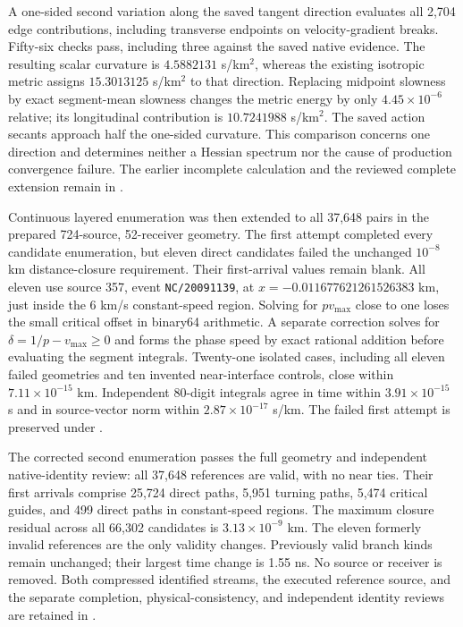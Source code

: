 A one-sided second variation along the saved tangent direction evaluates all
2,704 edge contributions, including transverse endpoints on velocity-gradient
breaks. Fifty-six checks pass, including three against the saved native
evidence. The resulting scalar
curvature is $4.5882131$ s/km$^2$, whereas the existing isotropic metric assigns
$15.3013125$ s/km$^2$ to that direction. Replacing midpoint slowness by exact
segment-mean slowness changes the metric energy by only $4.45\times10^{-6}$
relative; its longitudinal contribution is $10.7241988$ s/km$^2$.
The saved action secants approach half the one-sided curvature. This comparison
concerns one direction and determines neither a Hessian spectrum nor the cause
of production convergence failure. The earlier incomplete calculation and the
reviewed complete extension remain in
.

Continuous layered enumeration was then extended to all 37,648 pairs in
the prepared 724-source, 52-receiver geometry. The first attempt completed
every candidate enumeration, but eleven direct candidates failed the
unchanged $10^{-8}$ km distance-closure requirement. Their first-arrival
values remain blank. All eleven use source 357, event
\texttt{NC/20091139}, at $x=-0.011677621261526383$ km, just inside the
6 km/s constant-speed region. Solving for $p v_{\max}$ close to one loses
the small critical offset in binary64 arithmetic. A separate correction
solves for $\delta=1/p-v_{\max}\geq0$ and forms the phase speed by exact
rational addition before evaluating the segment integrals. Twenty-one
isolated cases, including all eleven failed geometries and ten invented
near-interface controls, close within $7.11\times10^{-15}$ km. Independent
80-digit integrals agree in time within $3.91\times10^{-15}$ s and in
source-vector norm within $2.87\times10^{-17}$ s/km. The failed first attempt
is preserved under .

The corrected second enumeration passes the full geometry and independent
native-identity review: all 37,648 references are valid, with no near ties.
Their first arrivals comprise 25,724 direct paths, 5,951 turning paths,
5,474 critical guides, and 499 direct paths in constant-speed regions.
The maximum closure residual across all 66,302 candidates is
$3.13\times10^{-9}$ km. The eleven formerly invalid references are the only
validity changes. Previously valid branch kinds remain unchanged; their
largest time change is 1.55 ns. No source or receiver is removed. Both
compressed identified streams, the executed reference source, and the
separate completion, physical-consistency, and independent identity reviews
are retained in .

